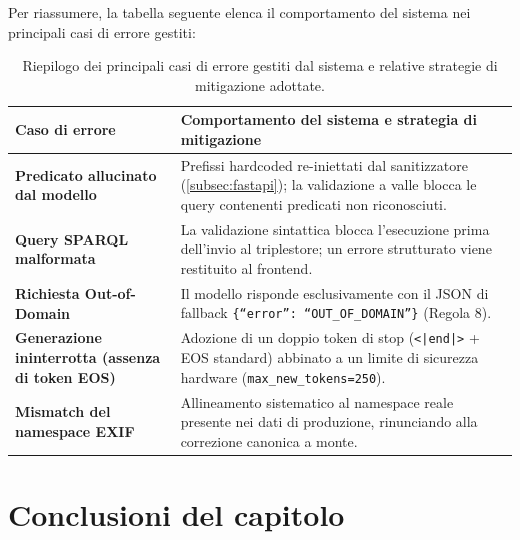 \documentclass[12pt,a4paper,oneside]{book}
\newcommand{\code}[1]{\colorbox{light-gray}{\texttt{#1}}}
\begin{document}
Per riassumere, la tabella seguente elenca il comportamento del sistema nei principali casi di errore gestiti:

\begin{table}[htbp]
    \centering
    \renewcommand{\arraystretch}{1.2}
\begin{tabularx}{\textwidth}{@{} >{\raggedright\arraybackslash\bfseries}p{5cm} >{\raggedright\arraybackslash}X @{}}
        \toprule
        Caso di errore & Comportamento del sistema e strategia di mitigazione \\
        \midrule
        Predicato allucinato dal modello 
        & Prefissi hardcoded re-iniettati dal sanitizzatore (\cref{subsec:fastapi}); la validazione a valle blocca le query contenenti predicati non riconosciuti. \\
        \addlinespace
        Query SPARQL malformata 
        & La validazione sintattica blocca l'esecuzione prima dell'invio al triplestore; un errore strutturato viene restituito al frontend. \\
        \addlinespace
        Richiesta Out-of-Domain 
        & Il modello risponde esclusivamente con il JSON di fallback \code{\{``error'': ``OUT\_OF\_DOMAIN''\}} (Regola 8). \\
        \addlinespace
        Generazione ininterrotta \newline (assenza di token EOS) 
        & Adozione di un doppio token di stop (\code{<|end|>} + EOS standard) abbinato a un limite di sicurezza hardware (\code{max\_new\_tokens=250}). \\
        \addlinespace
        Mismatch del namespace EXIF 
        & Allineamento sistematico al namespace reale presente nei dati di produzione, rinunciando alla correzione canonica a monte. \\
        \bottomrule
    \end{tabularx}
    \caption{Riepilogo dei principali casi di errore gestiti dal sistema e relative strategie di mitigazione adottate.}\label{tab:gestione_errori}
\end{table}











\section{Conclusioni del capitolo}\label{sec:conclusioni_cap4}
\end{document}
